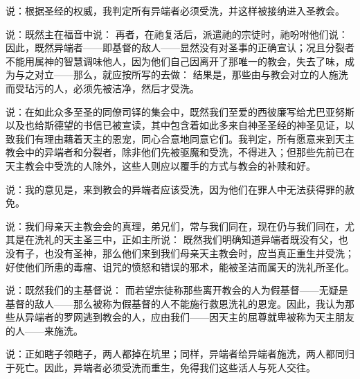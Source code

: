 说：根据圣经的权威，我判定所有异端者必须受洗，并这样被接纳进入圣教会。\par

说：既然主在福音中说：  再者，在祂复活后，派遣祂的宗徒时，祂吩咐他们说：  因此，既然异端者——即基督的敌人——显然没有对圣事的正确宣认；况且分裂者不能用属神的智慧调味他人，因为他们自己因离开了那唯一的教会，失去了味，成为与之对立——那么，就应按所写的去做： 结果是，那些由与教会对立的人施洗而受玷污的人，必须先被洁净，然后才受洗。\par

说：在如此众多至圣的同僚司铎的集会中，既然我们至爱的西彼廉写给尤巴亚努斯以及也给斯德望的书信已被宣读，其中包含着如此多来自神圣圣经的神圣见证，以致我们有理由藉着天主的恩宠，同心合意地同意它们。我判定，所有愿意来到天主教会中的异端者和分裂者，除非他们先被驱魔和受洗，不得进入；但那些先前已在天主教会中受洗的人除外，这些人则应以覆手的方式与教会的补赎和好。\par

说：我的意见是，来到教会的异端者应该受洗，因为他们在罪人中无法获得罪的赦免。\par

说：我们母亲天主教会会的真理，弟兄们，常与我们同在，现在仍与我们同在，尤其是在洗礼的天主圣三中，正如主所说：  既然我们明确知道异端者既没有父，也没有子，也没有圣神，那么他们来到我们母亲天主教会时，应当真正重生并受洗；好使他们所患的毒瘤、诅咒的愤怒和错误的邪术，能被圣洁而属天的洗礼所圣化。\par

说：既然我们的主基督说：  而若望宗徒称那些离开教会的人为假基督——无疑是基督的敌人——那么被称为假基督的人不能施行救恩洗礼的恩宠。因此，我认为那些从异端者的罗网逃到教会的人，应由我们——因天主的屈尊就卑被称为天主朋友的人——来施洗。\par

说：正如瞎子领瞎子，两人都掉在坑里；同样，异端者给异端者施洗，两人都同归于死亡。因此，异端者必须受洗而重生，免得我们这些活人与死人交往。\par

